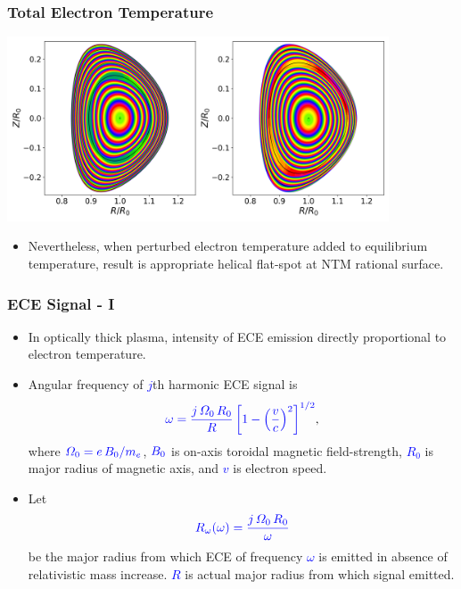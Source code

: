 \documentclass{beamer}
\begin{document}
\begin{frame}
\frametitle{Total Electron Temperature}
 
\begin{center}
\includegraphics[width=0.85\textwidth]{../Fig14.png}
\end{center}
\begin{itemize}
\item Nevertheless, when perturbed electron temperature added to equilibrium temperature, result is appropriate helical flat-spot at NTM rational surface. 
\end{itemize}
\end{frame}

\begin{frame}
\frametitle{ECE Signal - I}
 
 \begin{itemize}
 \item In optically thick plasma, intensity of ECE emission directly proportional to electron temperature.
 \item Angular frequency of \textcolor{blue}{$j$}th harmonic ECE signal is
 $$
 \textcolor{blue}{\omega = \frac{j\,{\mit\Omega}_0\,R_0}{R}\left[1-\left(\frac{v}{c}\right)^2\right]^{1/2}},
 $$
 where $\textcolor{blue}{{\mit\Omega}_0=e\,B_0/m_e}$, $\textcolor{blue}{B_0}$ is on-axis toroidal magnetic field-strength,  \textcolor{blue}{$R_0$} is major radius of magnetic axis, and \textcolor{blue}{$v$}
 is electron speed. 
 \item Let 
 $$
 \textcolor{blue}{R_\omega(\omega) = \frac{j\,{\mit\Omega}_0\,R_0}{\omega}}
 $$
be the major radius from which ECE of frequency \textcolor{blue}{$\omega$} is emitted  in  absence of relativistic mass increase. \textcolor{blue}{$R$}
is actual major radius from which signal emitted. 
\end{itemize}
 \end{frame}
 
\end{document}
